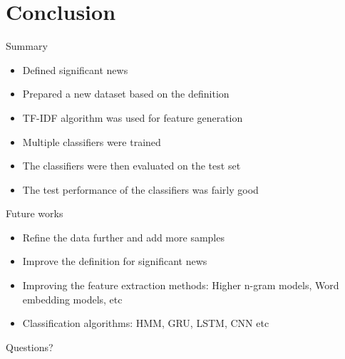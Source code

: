 \documentclass[12pt]{beamer}
\begin{document}
\section{Conclusion}

\begin{frame}{Summary}
    \begin{itemize}
        \item Defined significant news
        \item Prepared a new dataset based on the definition
        \item TF-IDF algorithm was used for feature generation
        \item Multiple classifiers were trained
        \item The classifiers were then evaluated on the test set
        \item The test performance of the classifiers was fairly good
    \end{itemize}
\end{frame}

\begin{frame}{Future works}
    \begin{itemize}
        \item Refine the data further and add more samples
        \item Improve the definition for significant news
        \item Improving the feature extraction methods: Higher n-gram models, Word embedding models, etc
        \item Classification algorithms: HMM, GRU, LSTM, CNN etc
    \end{itemize}
\end{frame}

{
\begin{frame}[standout]
  Questions?
\end{frame}
}

\appendix

%     
\end{document}
